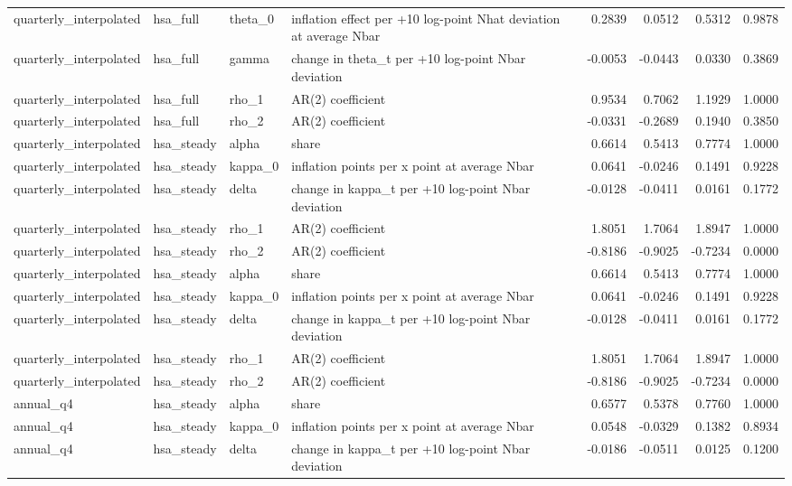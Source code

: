 \begin{tabular}{llllrrrr}
quarterly\_interpolated & hsa\_full & theta\_0 & inflation effect per +10 log-point Nhat deviation at average Nbar & 0.2839 & 0.0512 & 0.5312 & 0.9878 \\
quarterly\_interpolated & hsa\_full & gamma & change in theta\_t per +10 log-point Nbar deviation & -0.0053 & -0.0443 & 0.0330 & 0.3869 \\
quarterly\_interpolated & hsa\_full & rho\_1 & AR(2) coefficient & 0.9534 & 0.7062 & 1.1929 & 1.0000 \\
quarterly\_interpolated & hsa\_full & rho\_2 & AR(2) coefficient & -0.0331 & -0.2689 & 0.1940 & 0.3850 \\
quarterly\_interpolated & hsa\_steady & alpha & share & 0.6614 & 0.5413 & 0.7774 & 1.0000 \\
quarterly\_interpolated & hsa\_steady & kappa\_0 & inflation points per x point at average Nbar & 0.0641 & -0.0246 & 0.1491 & 0.9228 \\
quarterly\_interpolated & hsa\_steady & delta & change in kappa\_t per +10 log-point Nbar deviation & -0.0128 & -0.0411 & 0.0161 & 0.1772 \\
quarterly\_interpolated & hsa\_steady & rho\_1 & AR(2) coefficient & 1.8051 & 1.7064 & 1.8947 & 1.0000 \\
quarterly\_interpolated & hsa\_steady & rho\_2 & AR(2) coefficient & -0.8186 & -0.9025 & -0.7234 & 0.0000 \\
quarterly\_interpolated & hsa\_steady & alpha & share & 0.6614 & 0.5413 & 0.7774 & 1.0000 \\
quarterly\_interpolated & hsa\_steady & kappa\_0 & inflation points per x point at average Nbar & 0.0641 & -0.0246 & 0.1491 & 0.9228 \\
quarterly\_interpolated & hsa\_steady & delta & change in kappa\_t per +10 log-point Nbar deviation & -0.0128 & -0.0411 & 0.0161 & 0.1772 \\
quarterly\_interpolated & hsa\_steady & rho\_1 & AR(2) coefficient & 1.8051 & 1.7064 & 1.8947 & 1.0000 \\
quarterly\_interpolated & hsa\_steady & rho\_2 & AR(2) coefficient & -0.8186 & -0.9025 & -0.7234 & 0.0000 \\
annual\_q4 & hsa\_steady & alpha & share & 0.6577 & 0.5378 & 0.7760 & 1.0000 \\
annual\_q4 & hsa\_steady & kappa\_0 & inflation points per x point at average Nbar & 0.0548 & -0.0329 & 0.1382 & 0.8934 \\
annual\_q4 & hsa\_steady & delta & change in kappa\_t per +10 log-point Nbar deviation & -0.0186 & -0.0511 & 0.0125 & 0.1200 \\

\end{tabular}
